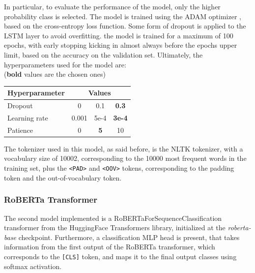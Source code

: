             In particular, to evaluate the performance of the model, only the
            higher probability class is selected.
            The model is trained using the ADAM optimizer \citep{kingma2017adam},
            based on the cross-entropy loss function. Some form of dropout
            is applied to the LSTM layer to avoid overfitting.
            the model is trained for a maximum of 100 epochs, with early stopping
            kicking in almost always before the epochs upper limit, based on the 
            accuracy on the validation set.
            Ultimately, the hyperparameters used for the model are: \\
            (\textbf{bold} values are the chosen ones)
            \begin{table}[H]
                \centering
                \begin{tabular}{l c c c}
                    \toprule
                    \multicolumn{1}{l}{\textbf{Hyperparameter}} & \multicolumn{3}{c}{\textbf{Values}} \\                  \midrule
                    Dropout & 0 & 0.1 & \textbf{0.3} \\
                    Learning rate & 0.001 & 5e-4 & \textbf{3e-4} \\
                    Patience & 0 & \textbf{5} & 10 \\
                    \bottomrule
                \end{tabular}
                \label{tab:lstm_hyperparams}
            \end{table}
            The tokenizer used in this model, as said before, is the NLTK tokenizer,
            with a vocabulary size of 10002, corresponding to the 10000 most
            frequent words in the training set, plus the \texttt{<PAD>} and \texttt{<OOV>} tokens,
            corresponding to the padding token and the out-of-vocabulary token.


        \subsubsection{RoBERTa Transformer}
        \label{subsubsec:roberta}
            The second model implemented is a RoBERTaForSequenceClassification transformer
            from the HuggingFace Transformers library, initialized at the \textit{roberta-base} 
            checkpoint. Furthermore, a classification MLP head is present, that takes information 
            from the first output of the RoBERTa transformer, which corresponds to the 
            \texttt{[CLS]} token, and maps it to the final output classes using softmax activation.

